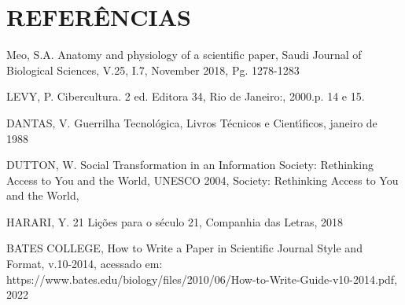 \documentclass[
12pt,		%
openright,	%
twoside,  %
a4paper,			%
chapter=TITLE,		%
english,			%
french,				%
spanish,			%
brazil				%
]{USPSC-classe/USPSC}
\begin{document}
\chapter[REFER\^ENCIAS]{REFER\^ENCIAS}\label{REFER\^ENCIAS}
\begin{flushleft}
\begin{flushleft}
[MEO, 2018] Meo, S.A. Anatomy and physiology of a scientific paper, Saudi Journal of Biological Sciences, V.25, I.7, November 2018, Pg. 1278-1283
\end{flushleft}


\end{flushleft}


\begin{flushleft}
\begin{flushleft}
[LEVY, 2000] LEVY, P. Cibercultura. 2 ed. Editora 34,  Rio de Janeiro:, 2000.p. 14 e 15.
\end{flushleft}


\end{flushleft}


\begin{flushleft}
\begin{flushleft}
[DANTAS, 1988] DANTAS, V. Guerrilha Tecnol\'ogica, Livros T\'ecnicos e Cient\'{\i}ficos, janeiro de 1988
\end{flushleft}


\end{flushleft}


\begin{flushleft}
\begin{flushleft}
[DUTTON, 2004] DUTTON, W. Social Transformation in an Information Society: Rethinking Access to You and the World, UNESCO 2004, Society: Rethinking Access to You and the World, 
\end{flushleft}


\end{flushleft}


\begin{flushleft}
\begin{flushleft}
[HARARI, 2018]  HARARI, Y. 21 Li\c{c}\~oes para o s\'eculo 21, Companhia das Letras, 2018
\end{flushleft}


\end{flushleft}


\begin{flushleft}
\begin{flushleft}
[BATES, 2014] BATES COLLEGE, How to Write a Paper in Scientific Journal Style and Format, v.10-2014, acessado em: https://www.bates.edu/biology/files/2010/06/How-to-Write-Guide-v10-2014.pdf, 2022
\end{flushleft}


\end{flushleft}
\end{document}
